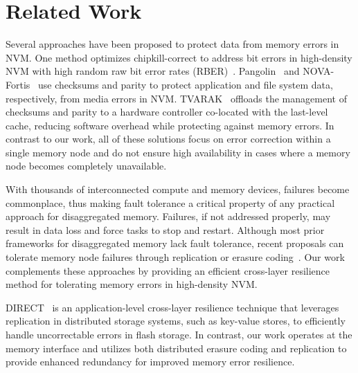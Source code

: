 \section{Related Work}

Several approaches have been proposed to protect data from memory errors in NVM. One method optimizes chipkill-correct to address bit errors in high-density NVM with high random raw bit error rates (RBER)~\cite{zhang:pm-chipkill:micro:2018}. Pangolin~\cite{zhang:pangolin:atc:2019} and NOVA-Fortis~\cite{xu:nova-fortis:sosp:2017} use checksums and parity to protect application and file system data, respectively, from media errors in NVM. TVARAK~\cite{kateja:tvarak:isca:2020} offloads the management of checksums and parity to a hardware controller co-located with the last-level cache, reducing software overhead while protecting against memory errors. In contrast to our work, all of these solutions focus on error correction within a single memory node and do not ensure high availability in cases where a memory node becomes completely unavailable.

With thousands of interconnected compute and memory devices, failures become commonplace, thus making fault tolerance a critical property of any practical approach for disaggregated memory. Failures, if not addressed properly, may result in data loss and force tasks to stop and restart. Although most prior frameworks for disaggregated memory lack fault tolerance, recent proposals can tolerate memory node failures through replication or erasure coding~\cite{zhou:carbink:osdi:2022, lee:hydra:fast:2022}. Our work complements these approaches by providing an efficient cross-layer resilience method for tolerating memory errors in high-density NVM.

DIRECT~\cite{tai:flash-uber:atc:2019} is an application-level cross-layer resilience technique that leverages replication in distributed storage systems, such as key-value stores, to efficiently handle uncorrectable errors in flash storage. 
In contrast, our work operates at the memory interface and utilizes both distributed erasure coding and replication to provide enhanced redundancy for improved memory error resilience.



